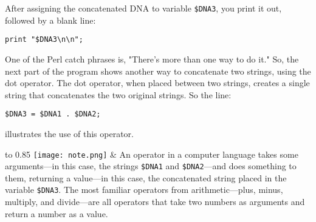 After assigning the concatenated DNA to variable \verb|$DNA3|, you print it out, followed by a blank line:

\begin{lstlisting}
print "$DNA3\n\n";
\end{lstlisting}

One of the Perl catch phrases is, "There's more than one way to do it." So, the next part of the program shows another way to concatenate two strings, using the dot operator. The dot operator, when placed between two strings, creates a single string that concatenates the two original strings. So the line:

\begin{lstlisting}
$DNA3 = $DNA1 . $DNA2;
\end{lstlisting}

illustrates the use of this operator.


\vspace{-5pt}
\begin{table}[h]
  \begin{center}
    \begin{tabu*} to 0.85\linewidth {|X[1,r,m]X[15,l,m]|}
      \tabucline{-}
      \texttt{[image: note.png]} & An operator in a computer language takes some arguments—in this case, the strings \verb|$DNA1| and \verb|$DNA2|—and does something to them, returning a value—in this case, the concatenated string placed in the variable \verb|$DNA3|. The most familiar operators from arithmetic—plus, minus, multiply, and divide—are all operators that take two numbers as arguments and return a number as a value.\\
      \tabucline{-}
    \end{tabu*}
  \end{center}
\end{table}
\vspace{-20pt}

